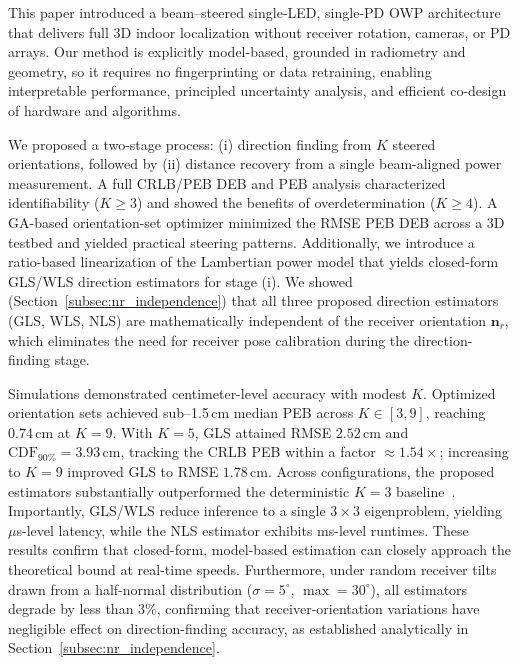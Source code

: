 \documentclass[journal]{IEEEtran}
\newcommand{\added}[1]{{\color{blue}#1}}
\newcommand{\deleted}[1]{{\color{red}#1}}
\begin{document}
This paper introduced a beam–steered single-LED, single-PD OWP architecture that delivers full 3D indoor localization without receiver rotation, cameras, or PD arrays. Our method is explicitly model-based, grounded in radiometry and geometry, so it requires no fingerprinting or data retraining, enabling interpretable performance, principled uncertainty analysis, and efficient co-design of hardware and algorithms.

We proposed a two-stage process: (i) direction finding from \(K\) steered orientations, followed by (ii) distance recovery from a single beam-aligned power measurement. A full \deleted{CRLB/PEB} \added{DEB and PEB} analysis characterized identifiability (\(K\!\ge\!3\)) and showed the benefits of overdetermination (\(K\!\ge\!4\)). A GA-based orientation-set optimizer minimized the RMSE \deleted{PEB} \added{DEB} across a 3D testbed and yielded practical steering patterns. Additionally, we introduce a ratio-based linearization of the Lambertian power model that yields closed-form GLS/WLS direction estimators for stage (i). \added{We showed (Section~\ref{subsec:nr_independence}) that all three proposed direction estimators (GLS, WLS, NLS) are mathematically independent of the receiver orientation $\mathbf{n}_r$, which eliminates the need for receiver pose calibration during the direction-finding stage.}

Simulations demonstrated centimeter-level accuracy with modest \(K\). Optimized orientation sets achieved sub–1.5\,cm median PEB across \(K\in[3,9]\), reaching \(0.74\,\mathrm{cm}\) at \(K=9\). With \(K=5\), GLS attained RMSE \(2.52\,\mathrm{cm}\) and \(\mathrm{CDF}_{90\%}=3.93\,\mathrm{cm}\), tracking the \deleted{CRLB} \added{PEB} within a factor \(\approx1.54\times\); increasing to \(K=9\) improved GLS to RMSE \(1.78\,\mathrm{cm}\). 
Across configurations, the proposed estimators substantially outperformed the deterministic \(K=3\) baseline~\cite{Chassagne2025}.
Importantly, GLS/WLS reduce inference to a single \(3\times3\) eigenproblem, yielding \(\mu\)s-level latency, while the NLS estimator exhibits ms-level runtimes. These results confirm that closed-form, model-based estimation can closely approach the theoretical bound at real-time speeds.
\added{Furthermore, under random receiver tilts drawn from a half-normal distribution ($\sigma=5^\circ$, $\max=30^\circ$), all estimators degrade by less than $3\%$, confirming that receiver-orientation variations have negligible effect on direction-finding accuracy, as established analytically in Section~\ref{subsec:nr_independence}.}
\end{document}
